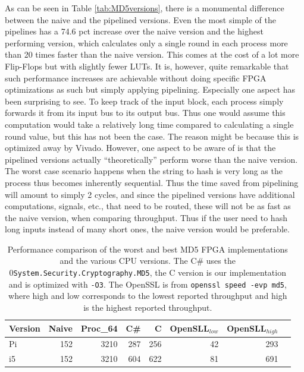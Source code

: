 \documentclass[a4paper, openany]{book}
\begin{document}
As can be seen in Table \ref{tab:MD5versions}, there is a monumental difference between the naive and the pipelined versions. Even the most simple of the pipelines has a 74.6 pct increase over the naive version and the highest performing version, which calculates only a single round in each process more than 20 times faster than the naive version. This comes at the cost of a lot more Flip-Flops but with slightly fewer LUTs. It is, however, quite remarkable that such performance increases are achievable without doing specific FPGA optimizations as such but simply applying pipelining. Especially one aspect has been surprising to see. To keep track of the input block, each process simply forwards it from its input bus to its output bus. Thus one would assume this computation would take a relatively long time compared to calculating a single round value, but this has not been the case. The reason might be because this is optimized away by Vivado. However, one aspect to be aware of is that the pipelined versions actually ``theoretically'' perform worse than the naive version. The worst case scenario happens when the string to hash is very long as the process thus becomes inherently sequential. Thus the time saved from pipelining will amount to simply 2 cycles, and since the pipelined versions have additional computations, signals, etc., that need to be routed, these will not be as fast as the naive version, when comparing throughput. Thus if the user need to hash long inputs instead of many short ones, the naive version would be preferable.
\begin{table}[!htb]
\centering
\captionsetup{width=.8\linewidth}
\begin{tabular}{l r r r r r r r}
\hline
\textbf{Version} & Naive & Proc_{64} & C\# & C & OpenSLL$_{low}$ & OpenSLL$_{high}$\\
\hline
Pi & 152 & 3210 & 287 & 256 & 42 & 293\\
i5 & 152 & 3210 & 604 & 622 & 81 & 691
\end{tabular}
\caption[MD5: FPGA and CPU comparisons]%
{Performance comparison of the worst and best MD5 FPGA implementations and the various CPU versions. The C\# uses the 0\texttt{System.Security.Cryptography.MD5}, the C version is our implementation and is optimized with \texttt{-O3}. The OpenSSL is from \texttt{openssl speed -evp md5}, where high and low corresponds to the lowest reported throughput and high is the highest reported throughput.}
\label{tab:MD5compare}
\end{table}
\end{document}
